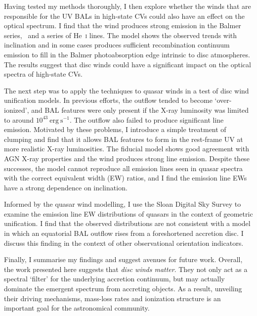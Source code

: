 \documentclass[a4paper, 11pt, twoside]{Thesis}  %
\begin{document}
{Having tested my methods thoroughly, I then explore whether the winds that are 
responsible for the UV BALs in high-state CVs could also have an 
effect on the optical spectrum. I find that the wind produces
strong emission in the Balmer series, \heiiopt\ and a series of He~\textsc{i} lines. 
The model shows the observed trends with inclination and in some cases 
produces sufficient recombination continuum emission to fill 
in the Balmer photoabsorption edge intrinsic to disc atmospheres. 
The results suggest that disc winds could have a significant impact on the
optical spectra of high-state CVs.

The next step was to apply the techniques to quasar winds in a test of 
disc wind unification models. In previous efforts, the outflow tended to become
`over-ionized', and BAL features were only present if the X-ray luminosity was
limited to around $10^{43}~\mathrm{erg~s^{-1}}$. The outflow also
failed to produce significant line emission.
Motivated by these problems, I introduce a simple treatment of clumping
and find that it allows BAL features to form in the rest-frame UV at more 
realistic X-ray luminosities. The fiducial model shows good agreement with AGN X-ray 
properties and the wind produces strong line emission. 
Despite these successes, the model cannot reproduce all emission lines seen in 
quasar spectra with the correct equivalent width (EW) ratios, and I find the
emission line EWs have a strong dependence on inclination.

Informed by the quasar wind modelling, I use the Sloan Digital Sky Survey to
examine the emission line EW distributions
of quasars in the context of geometric unification. I find that the observed 
distributions are not consistent with a model in which an equatorial BAL 
outflow rises from a foreshortened accretion disc. I discuss this finding
in the context of other observational orientation indicators.

Finally, I summarise my findings and suggest avenues for future work.
Overall, the work presented here suggests that {\em disc winds matter}. 
They not only act as a spectral `filter' for the underlying
accretion continuum, but may actually dominate the emergent spectrum from 
accreting objects. As a result, unveiling their driving mechanisms, 
mass-loss rates and ionization structure is an important goal for the 
astronomical community. 
}

\cleardoublepage  %
\end{document}

